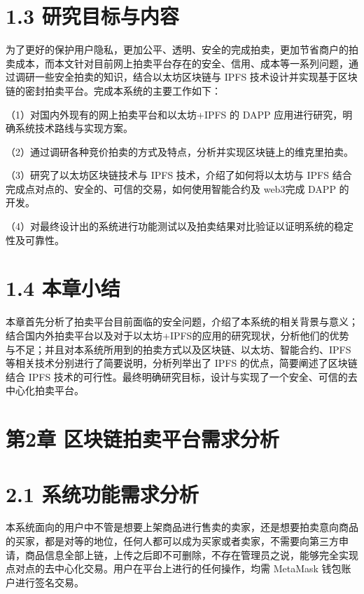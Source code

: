\documentclass[
  10
]{article}
\begin{document}
\section{1.3
研究目标与内容}\label{ux7814ux7a76ux76eeux6807ux4e0eux5185ux5bb9}

为了更好的保护用户隐私，更加公平、透明、安全的完成拍卖，更加节省商户的拍卖成本，而本文针对目前网上拍卖平台存在的安全、信用、成本等一系列问题，通过调研一些安全拍卖的知识，结合以太坊区块链与
IPFS 技术设计并实现基于区块链的密封拍卖平台。完成本系统的主要工作如下：

（1）对国内外现有的网上拍卖平台和以太坊+IPFS 的 DAPP
应用进行研究，明确系统技术路线与实现方案。

（2）通过调研各种竞价拍卖的方式及特点，分析并实现区块链上的维克里拍卖。

（3）研究了以太坊区块链技术与 IPFS 技术，介绍了如何将以太坊与 IPFS
结合完成点对点的、安全的、可信的交易，如何使用智能合约及 web3完成 DAPP
的开发。

（4）对最终设计出的系统进行功能测试以及拍卖结果对比验证以证明系统的稳定性及可靠性。

\section{1.4 本章小结}\label{ux672cux7ae0ux5c0fux7ed3}

本章首先分析了拍卖平台目前面临的安全问题，介绍了本系统的相关背景与意义；结合国内外拍卖平台以及对于以太坊+IPFS的应用的研究现状，分析他们的优势与不足；并且对本系统所用到的拍卖方式以及区块链、以太坊、智能合约、IPFS
等相关技术分别进行了简要说明，分析列举出了 IPFS
的优点，简要阐述了区块链结合 IPFS
技术的可行性。最终明确研究目标，设计与实现了一个安全、可信的去中心化拍卖平台。

\section{第2章
区块链拍卖平台需求分析}\label{ux7b2c2ux7ae0-ux533aux5757ux94feux62cdux5356ux5e73ux53f0ux9700ux6c42ux5206ux6790}

\section{2.1
系统功能需求分析}\label{ux7cfbux7edfux529fux80fdux9700ux6c42ux5206ux6790}

本系统面向的用户中不管是想要上架商品进行售卖的卖家，还是想要拍卖意向商品的买家，都是对等的地位，任何人都可以成为买家或者卖家，不需要向第三方申请，商品信息全部上链，上传之后即不可删除，不存在管理员之说，能够完全实现点对点的去中心化交易。用户在平台上进行的任何操作，均需
MetaMask 钱包账户进行签名交易。
\end{document}
